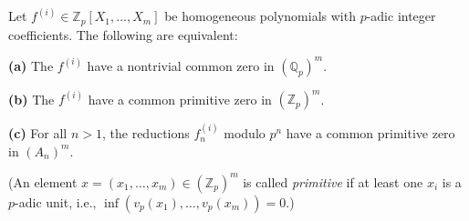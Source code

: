 Let $f^{(i)} \in \mathbb{Z}_p[X_1, \ldots, X_m]$ be homogeneous polynomials with $p$-adic integer coefficients. The following are equivalent:

\textbf{(a)} The $f^{(i)}$ have a nontrivial common zero in $(\mathbb{Q}_p)^m$.

\textbf{(b)} The $f^{(i)}$ have a common primitive zero in $(\mathbb{Z}_p)^m$.

\textbf{(c)} For all $n > 1$, the reductions $f_n^{(i)}$ modulo $p^n$ have a common primitive zero in $(A_n)^m$.

(An element $x = (x_1, \ldots, x_m) \in (\mathbb{Z}_p)^m$ is called \textit{primitive} if at least one $x_i$ is a $p$-adic unit, i.e., $\inf(v_p(x_1), \ldots, v_p(x_m)) = 0$.)

